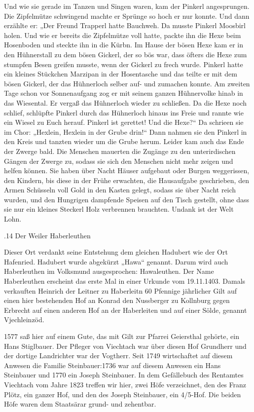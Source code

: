 \documentclass{book}
\begin{document}
Und wie sie gerade im Tanzen und Singen waren, kam der Pinkerl angesprungen. Die
Zipfelmütze schwingend machte er Sprünge so hoch er nur konnte. Und dann
erzählte er: „Der Freund Trapperl hatte Bauchweh. Da musste Pinkerl Moosbirl
holen. Und wie er bereits die Zipfelmütze voll hatte, packte ihn die Hexe beim
Hosenboden und steckte ihn in die Kürbn. Im Hause der bösen Hexe kam er in den
Hühnerstall zu dem bösen Gickerl, der so bös war, dass öfters die Hexe zum
stumpfen Besen greifen musste, wenn der Gickerl zu frech wurde. Pinkerl hatte
ein kleines Stückchen Marzipan in der Hosentasche und das teilte er mit dem
bösen Gickerl, der das Hühnerloch selber auf- und zumachen konnte. Am zweiten
Tage schon vor Sonnenaufgang zog er mit seinem ganzen Hühnervolke hinab in das
Wiesental. Er vergaß das Hühnerloch wieder zu schließen. Da die Hexe noch
schlief, schlüpfte Pinkerl durch das Hühnerloch hinaus ins Freie und rannte wie
ein Wiesel zu Euch herauf. Pinkerl ist gerettet! Und die Hexe?“ Da schrieen sie
im Chor: „Hexlein, Hexlein in der Grube drin!“ Dann nahmen sie den Pinkerl in
den Kreis und tanzten wieder um die Grube herum. Leider kam auch das Ende der
Zwerge bald. Die Menschen mauerten die Zugänge zu den unterirdischen Gängen der
Zwerge zu, sodass sie sich den Menschen nicht mehr zeigen und helfen können. Sie
haben über Nacht Häuser aufgebaut oder Burgen weggerissen, den Kindern, bis
diese in der Frühe erwachten, die Hausaufgabe geschrieben, den Armen Schüsseln
voll Gold in den Kasten gelegt, sodass sie über Nacht reich wurden, und den
Hungrigen dampfende Speisen auf den Tisch gestellt, ohne dass sie nur ein
kleines Steckerl Holz verbrennen brauchten. Undank ist der Welt Lohn.

.14 Der Weiler Haberleuthen

Dieser Ort verdankt seine Entstehung dem gleichen Hadubert wie der Ort
Hafenried. Hadubert wurde abgekürzt „Hawa“ genannt. Darum wird auch Haberleuthen
im Volksmund ausgesprochen: Hawaleuthen. Der Name Haberleuthen erscheint das
erste Mal in einer Urkunde vom 19.11.1403. Damals verkauften Heinrich der
Leitner zu Haberleitn 60 Pfennige jährlicher Gilt auf einen hier bestehenden Hof
an Konrad den Nussberger zu Kollnburg gegen Erbrecht auf einen anderen Hof an
der Haberleiten und auf einer Sölde, genannt Vjechleinzöd.

1577 saß hier auf einem Gute, das mit Gilt zur Pfarrei Geiersthal gehörte, ein
Hans Stiglbauer. Der Pfleger von Viechtach war über diesen Hof Grundherr und der
dortige Landrichter war der Vogtherr. Seit 1749 wirtschaftet auf diesem Anwesen
die Familie Steinbauer:1736 war auf diesem Anwesen ein Hans Steinbauer und 1770
ein Joseph Steinbauer. In dem Gefällebuch des Rentamtes Viechtach vom Jahre 1823
treffen wir hier, zwei Höfe verzeichnet, den des Franz Plötz, ein ganzer Hof,
und den des Joseph Steinbauer, ein 4/5-Hof. Die beiden Höfe waren dem Staatsärar
grund- und zehentbar.
\end{document}
